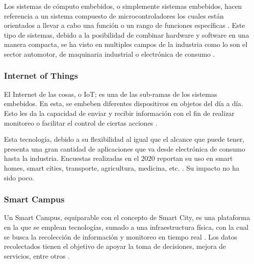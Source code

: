 \documentclass[12pt]{article}
\begin{document}
    Los sistemas de cómputo embebidos, o simplemente sistemas embebidos, hacen referencia a un sistema compuesto de microcontroladores los cuales están orientados a llevar a cabo una función o un rango de funciones específicas \cite{heath2002embedded}. Este tipo de sistemas, debido a la posibilidad de combinar hardware y software en una manera compacta, se ha visto en multiples campos de la industria como lo son el sector automotor, de maquinaria industrial o electrónica de consumo \cite{deichmann_2022}.


    \subsubsection*{Internet of Things}


    El Internet de las cosas, o IoT; es una de las sub-ramas de los sistemas embebidos. En esta, se embeben diferentes dispositivos en objetos del día a día. Esto les da la capacidad de enviar y recibir información con el fin de realizar monitoreo o facilitar el control de ciertas acciones \cite{Berte_2018}.

    Esta tecnología, debido a su flexibilidad al igual que el alcance que puede tener, presenta una gran cantidad de aplicaciones que va desde electrónica de consumo hasta la industria. Encuestas realizadas en el 2020 reportan su uso en smart homes, smart cities, transporte, agricultura, medicina, etc. \cite{Dawood_2020}. Su impacto no ha sido poco.


    \subsubsection*{Smart Campus}


    Un Smart Campus, equiparable con el concepto de Smart City, es una plataforma en la que se emplean tecnologías, sumado a una infraestructura física, con la cual se busca la recolección de información y monitoreo en tiempo real \cite{MinAllah2020}. Los datos recolectados tienen el objetivo de apoyar la toma de decisiones, mejora de servicios, entre otros \cite{Anagnostopoulos_2023}.
\end{document}

